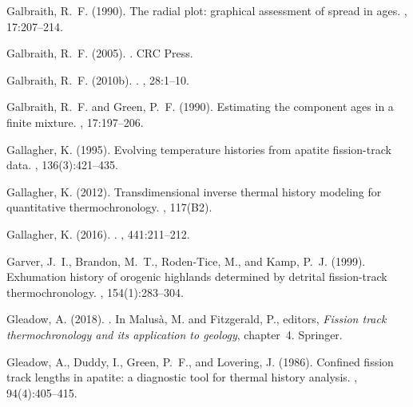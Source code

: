 \documentclass{article}
\begin{document}
\begin{thebibliography}{}
Galbraith, R.~F. (1990).
\newblock The radial plot: graphical assessment of spread in ages.
, 17:207--214.

Galbraith, R.~F. (2005).
.
\newblock CRC Press.

Galbraith, R.~F. (2010b).
.
, 28:1--10.

Galbraith, R.~F. and Green, P.~F. (1990).
\newblock Estimating the component ages in a finite mixture.
, 17:197--206.

Gallagher, K. (1995).
\newblock Evolving temperature histories from apatite fission-track data.
, 136(3):421--435.

Gallagher, K. (2012).
\newblock Transdimensional inverse thermal history modeling for quantitative
  thermochronology.
,
  117(B2).

Gallagher, K. (2016).
.
, 441:211--212.

Garver, J.~I., Brandon, M.~T., Roden-Tice, M., and Kamp, P.~J. (1999).
\newblock Exhumation history of orogenic highlands determined by detrital
  fission-track thermochronology.
,
  154(1):283--304.

Gleadow, A. (2018).
.
\newblock In Malus\`{a}, M. and Fitzgerald, P., editors, {\em Fission track
  thermochronology and its application to geology}, chapter~4. Springer.

Gleadow, A., Duddy, I., Green, P.~F., and Lovering, J. (1986).
\newblock Confined fission track lengths in apatite: a diagnostic tool for
  thermal history analysis.
, 94(4):405--415.


\end{thebibliography}
\end{document}
